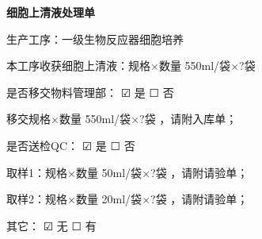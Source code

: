 \documentclass[UTF8,10pt,a4paper,fontset=fandol]{ctexart}
\newcommand{\fieldvalue}[1]{#1}
\newcommand{\handwritten}[1]{#1}
\newcommand{\checkboxfield}[1]{\ifstrequal{#1}{checked}{☑}{\ifstrequal{#1}{unclear}{?}{☐}}}
\begin{document}
\begin{center}
\textbf{细胞上清液处理单}
\end{center}

生产工序：一级生物反应器细胞培养

本工序收获细胞上清液：规格$\times$数量
\fieldvalue{\handwritten{550ml/袋$\times$?袋}}

\par\medskip

是否移交物料管理部：
\fieldvalue{\checkboxfield{checked}} 是
\quad
\fieldvalue{\checkboxfield{unchecked}} 否

\par\medskip

移交规格$\times$数量
\fieldvalue{\handwritten{550ml/袋$\times$?袋}}
，请附入库单；

\par\medskip

是否送检QC：
\fieldvalue{\checkboxfield{checked}} 是
\quad
\fieldvalue{\checkboxfield{unchecked}} 否

\par\medskip

取样1：规格$\times$数量
\fieldvalue{\handwritten{50ml/袋$\times$?袋}}
，请附请验单；

\par\medskip

取样2：规格$\times$数量
\fieldvalue{\handwritten{20ml/袋$\times$?袋}}
，请附请验单；

\par\medskip

其它：
\fieldvalue{\checkboxfield{checked}} 无
\quad
\fieldvalue{\checkboxfield{unchecked}} 有
\hrulefill
\end{document}
